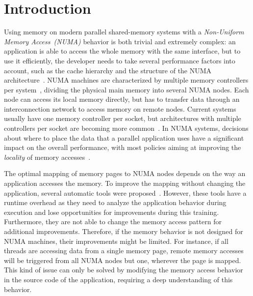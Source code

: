 
\section{Introduction}
\label{sec:intro}

Using memory on modern parallel shared-memory systems with a \emph{Non-Uniform Memory Access~(NUMA)} behavior is both trivial and extremely complex: an application is able to access the whole memory with the same interface, but to use it efficiently, the developer needs to take several performance factors into account, such as the cache hierarchy and the structure of the NUMA architecture~\cite{Drepper07What}.
NUMA machines are characterized by multiple memory controllers per system~\cite{Awasthi2010}, dividing the physical main memory into several NUMA nodes.
Each node can access its local memory directly, but has to transfer data
through an interconnection network to access memory on remote nodes.
Current systems usually have one memory controller per socket, but architectures with multiple controllers per socket are becoming more common~\cite{AMD2012}.
In NUMA systems, decisions about where to place the data that a parallel
application uses have a significant impact on the overall performance, with
most policies aiming at improving the \emph{locality} of memory accesses~\cite{Diener2015}.

The optimal mapping of memory pages to NUMA nodes depends on the way an application accesses the memory.
To improve the mapping without changing the application, several automatic tools were proposed~\cite{Corbet2012,Corbet,Dashti2013,Diener2014,Piccoli2014}.
However, these tools have a runtime overhead as they need to analyze the application behavior during execution and lose opportunities for improvements during this training.
Furthermore, they are not able to change the memory access pattern for additional improvements.
Therefore, if the memory behavior is not designed for NUMA machines, their improvements might be limited.
For instance, if all threads are accessing data from a single memory
page, remote memory accesses will be triggered from all NUMA nodes but one,
wherever the page is mapped.
This kind of issue can only be solved by modifying the memory access behavior
in the source code of the application, requiring a deep understanding of this behavior.

